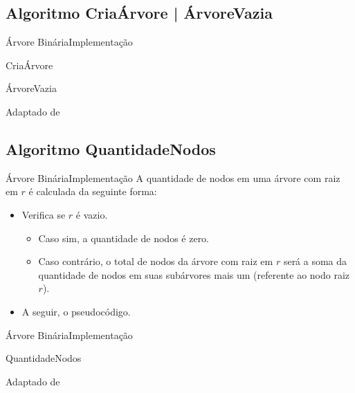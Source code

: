 \documentclass[aspectratio=169]{beamer}
\begin{document}

\subsection{Algoritmo CriaÁrvore | ÁrvoreVazia}

\begin{frame}{Árvore Binária}{Implementação}
\begin{algorithm}[H]
\caption{CriaÁrvore} 
\label{CriaArvore}
\end{algorithm}
\begin{algorithm}[H]
\caption{ÁrvoreVazia} 
\label{ArvoreVazia}
\end{algorithm}
\tiny{Adaptado de \cite{Backes2016}}
\end{frame}

\subsection{Algoritmo QuantidadeNodos}

\begin{frame}{Árvore Binária}{Implementação}
A quantidade de nodos em uma árvore com raiz em $r$ é calculada da seguinte forma:
 \begin{itemize}
 \item Verifica se $r$ é vazio. 
 \begin{itemize}
 \item Caso sim, a quantidade de nodos é zero.
 \item Caso contrário, o total de nodos da árvore com raiz em $r$ será a soma da quantidade de nodos em suas subárvores mais um (referente ao nodo raiz $r$).
 \end{itemize} 
 \item A seguir, o pseudocódigo.
 \end{itemize} 
\end{frame}

\begin{frame}{Árvore Binária}{Implementação}
\begin{algorithm}[H]
\caption{QuantidadeNodos} 
\label{QuantidadeNodos}
\end{algorithm}
\tiny{Adaptado de \cite{Backes2016}}
\end{frame}
\end{document}
